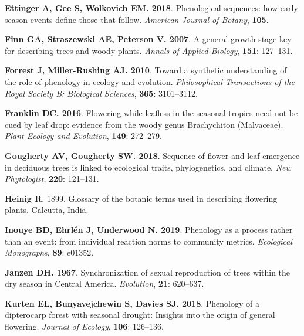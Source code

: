 \documentclass[11pt]{article}
\begin{document}
\begin{thebibliography}{39}
{\bf Ettinger A, Gee S, Wolkovich EM}{\bf . 2018}.
\newblock Phenological sequences: how early season events define those that
follow.
\newblock \emph{American Journal of Botany}, {\bf 105}.

{\bf Finn GA, Straszewski AE, Peterson V}{\bf . 2007}.
\newblock A general growth stage key for describing trees and woody plants.
\newblock \emph{Annals of Applied Biology}, {\bf 151}: 127--131.

{\bf Forrest J, Miller-Rushing AJ}{\bf . 2010}.
\newblock Toward a synthetic understanding of the role of phenology in ecology
and evolution.
\newblock \emph{Philosophical Transactions of the Royal Society B: Biological
Sciences}, {\bf 365}: 3101--3112.

{\bf Franklin DC}{\bf . 2016}.
\newblock Flowering while leafless in the seasonal tropics need not be cued by
leaf drop: evidence from the woody genus Brachychiton (Malvaceae).
\newblock \emph{Plant Ecology and Evolution}, {\bf 149}: 272--279.

{\bf Gougherty AV, Gougherty SW}{\bf . 2018}.
\newblock Sequence of flower and leaf emergence in deciduous trees is linked to
ecological traits, phylogenetics, and climate.
\newblock \emph{New Phytologist}, {\bf 220}: 121--131.

{\bf Heinig R}. 1899.
\newblock Glossary of the botanic terms used in describing flowering plants.
\newblock Calcutta, India.

{\bf Inouye BD, Ehrl{\'e}n J, Underwood N}{\bf . 2019}.
\newblock Phenology as a process rather than an event: from individual reaction
norms to community metrics.
\newblock \emph{Ecological Monographs}, {\bf 89}: e01352.

{\bf Janzen DH}{\bf . 1967}.
\newblock Synchronization of sexual reproduction of trees within the dry season
in Central America.
\newblock \emph{Evolution}, {\bf 21}: 620--637.

{\bf Kurten EL, Bunyavejchewin S, Davies SJ}{\bf . 2018}.
\newblock Phenology of a dipterocarp forest with seasonal drought: Insights
into the origin of general flowering.
\newblock \emph{Journal of Ecology}, {\bf 106}: 126--136.


\end{thebibliography}
\end{document}
